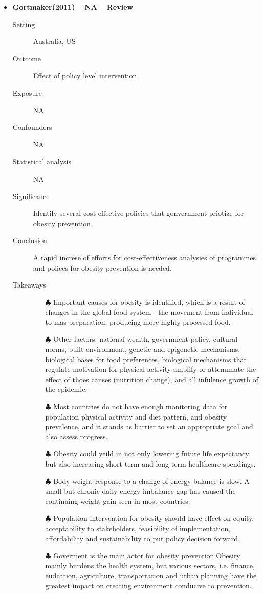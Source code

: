 \documentclass{article}
\begin{document}
\begin{itemize}
\item{\bf Gortmaker(2011) -- NA  -- Review} 
		\begin{description}
			\item[Setting] Australia, US 
			\item[Outcome] Effect of policy level intervention 
			\item[Exposure] NA
			\item[Confounders] NA
			\item[Statistical analysis] NA
			\item[Significance] Identify several cost-effective policies that gonvernment priotize for obesity prevention. 
			\item[Conclusion] A rapid increse of efforts for cost-effectiveness analysies of programmes and polices for obesity prevention is needed. 
			\item[Takeaways] \mbox{}\par
				\begin{itemize}
					\item[$\clubsuit$] Important causes for obesity is identified, which is a result of changes in the global food system - the movement from individual to mas preparation, producing more highly processed food.   
					\item[$\clubsuit$] Other factors: national wealth, government policy, cultural norms, built environment, genetic and epigenetic mechanisms, biological bases for food preferences, biological mechanisms that regulate motivation for physical activity amplify or attenumate the effect of thoes causes (nutrition change), and all infulence growth of the epidemic. 
					\item[$\clubsuit$] Most countries do not have enough monitoring data for population physical activity and diet pattern, and obesity prevalence, and it stands as barrier to set an appropriate goal and also assess progress. 
					\item[$\clubsuit$] Obesity could yeild in not only lowering future life expectancy but also increasing short-term and long-term healthcare spendings.
					\item[$\clubsuit$] Body weight response to a change of energy balance is slow. A small but chronic daily energy imbalance gap has caused the continuing weight gain seen in most countries.
					\item[$\clubsuit$] Population intervention for obesity should have effect on equity, acceptability to stakeholders, feasibility of implementation, affordability and sustainability to put policy decision forward. 
					\item[$\clubsuit$] Goverment is the main actor for obesity prevention.Obesity mainly burdens the health system, but various sectors, i.e. finance, eudcation, agriculture, transportation and urban planning have the greatest impact on creating environment conducive to prevention. 
				\end{itemize} 
		\end{description}


\end{itemize}
\end{document}
